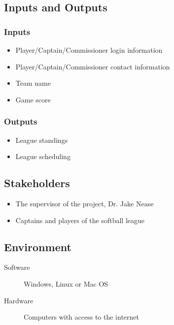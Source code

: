 \documentclass{article}
\begin{document}
\subsection{Inputs and Outputs}

\subsubsection{Inputs}

\begin{itemize}
    \item Player/Captain/Commissioner login information
    \item Player/Captain/Commissioner contact information
    \item Team name
    \item Game score
\end{itemize}

\subsubsection{Outputs}

\begin{itemize}
    \item League standings
    \item League scheduling
\end{itemize}


\subsection{Stakeholders}

\begin{itemize}
    \item The supervisor of the project, Dr. Jake Nease
    \item Captains and players of the softball league
\end{itemize}

\subsection{Environment}

\begin{description}
    \item [Software] Windows, Linux or Mac OS
    \item [Hardware] Computers with access to the internet
\end{description}
\end{document}
